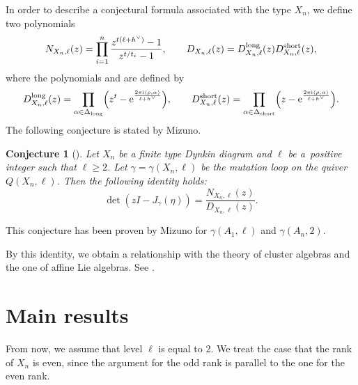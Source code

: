 \documentclass[10pt,a4paper]{amsart}
\numberwithin{equation}{section}
\newtheorem{Conjecture}[Theorem]{Conjecture}
 { \theoremstyle{definition}
\newtheorem{Definition}[Theorem]{Definition}
\newtheorem{Note}[Theorem]{Note}
\newtheorem{Example}[Theorem]{Example}
\newtheorem{Remark}[Theorem]{Remark} }
\newcommand{\pair}[1]{\langle{#1}\rangle}
\begin{document}
In order to describe a conjectural formula associated with the type $X_n$, we define two polynomials
		\[N_{X_n,\ell}(z)=\prod_{i=1}^n\frac{z^{t(\ell+h^\vee)}-1}{z^{t/t_i}-1},\qquad D_{X_n,\ell}(z)=D_{X_n,\ell}^{{\rm long}}(z)D_{X_n,\ell}^{{\rm short}}(z),\]
where the polynomials  and  are defined by
		\[D_{X_n,\ell}^{{\rm long}}(z)=\prod_{\alpha\in\Delta_{{\rm long}}}\Bigl(z^t-{\rm e}^\frac{2\pi {\rm i}\pair{\rho,\alpha}}{\ell+h^\vee}\Bigr),\qquad D_{X_n,\ell}^{{\rm short}}(z)=\prod_{\alpha\in\Delta_{{\rm short}}}\Bigl(z-{\rm e}^\frac{2\pi {\rm i}\pair{\rho,\alpha}}{\ell+h^\vee}\Bigr).\]
The following conjecture is stated by Mizuno.
	\begin{Conjecture}[{\cite[Conjecture 3.8]{M}}]\label{MConj}
	Let $X_n$ be a finite type Dynkin diagram and $\ell$ be a~positive integer such that $\ell\geq2$.
	Let $\gamma=\gamma(X_n,\ell)$ be the mutation loop on the quiver $Q(X_n,\ell)$.
	Then the following identity holds:
		\[\det (zI-J_\gamma(\eta))=\frac{N_{X_n,\ell}(z)}{D_{X_n,\ell}(z)}.\]
	\end{Conjecture}
	\begin{Remark}
	This conjecture has been proven by Mizuno for $\gamma(A_1,\ell)$ and $\gamma(A_n,2)$.
	\end{Remark}
By this identity, we obtain a relationship with the theory of cluster algebras and the one of affine Lie algebras.
See \cite{M}.


	\section{Main results}
	From now, we assume that level $\ell$ is equal to 2.
	We treat the case that the rank of $X_n$ is even, since the argument for the odd rank is parallel to the one for the even rank.
		
\end{document}
